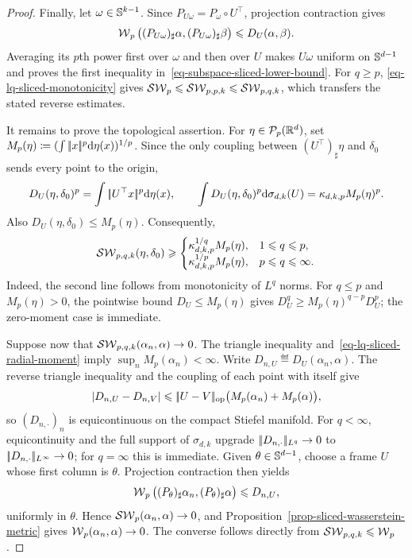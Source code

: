 \begin{proof}
	Finally, let $\omega\in\mathbb{S}^{k-1}$. Since
	$P_{U\omega}=P_\omega\circ U^\top$, projection contraction gives
	\[
		\operatorname{\mathcal{W}}_p\big((P_{U\omega})_\sharp\alpha,
		              (P_{U\omega})_\sharp\beta\big)
		\leqslant D_U(\alpha,\beta).
	\]
	Averaging its $p$th power first over $\omega$ and then over $U$ makes
	$U\omega$ uniform on $\mathbb{S}^{d-1}$ and proves the first inequality
	in~\eqref{eq-subspace-sliced-lower-bound}. For $q\geq p$,
	\eqref{eq-lq-sliced-monotonicity} gives
	$\operatorname{\mathcal{SW}}_p\leqslant\operatorname{\mathcal{SW}}_{p,p,k}\leqslant\operatorname{\mathcal{SW}}_{p,q,k}$, which transfers the stated reverse
	estimates.

	It remains to prove the topological assertion. For
	$\eta\in\mathcal{P}_p(\mathbb{R}^d)$, set
	$M_p(\eta)\coloneqq(\int|\!| x |\!|^p\mathrm{d}\eta(x))^{1/p}$. Since the only coupling
	between $(U^\top)_\sharp\eta$ and $\delta_0$ sends every point to the origin,
	\[
		D_U(\eta,\delta_0)^p
		=
		\int|\!| U^\top x |\!|^p\mathrm{d}\eta(x),
		\qquad
		\int D_U(\eta,\delta_0)^p\mathrm{d}\sigma_{d,k}(U)
		=
		\kappa_{d,k,p}M_p(\eta)^p.
	\]
	Also $D_U(\eta,\delta_0)\leq M_p(\eta)$. Consequently,
	\begin{equation}\label{eq-lq-sliced-radial-moment}
		\operatorname{\mathcal{SW}}_{p,q,k}(\eta,\delta_0)
		\geqslant
		\begin{cases}
			\kappa_{d,k,p}^{1/q}M_p(\eta), & 1\leqslant q\leqslant p,\\
			\kappa_{d,k,p}^{1/p}M_p(\eta), & p\leqslant q\leqslant\infty.
		\end{cases}
	\end{equation}
	Indeed, the second line follows from monotonicity of $L^q$ norms. For
	$q\leq p$ and $M_p(\eta)>0$, the pointwise bound
	$D_U\leq M_p(\eta)$ gives
	$D_U^q\geq M_p(\eta)^{q-p}D_U^p$; the zero-moment case is immediate.

	Suppose now that $\operatorname{\mathcal{SW}}_{p,q,k}(\alpha_n,\alpha)\to0$. The triangle inequality
	and~\eqref{eq-lq-sliced-radial-moment} imply
	$\sup_n M_p(\alpha_n)<\infty$. Write
	$D_{n,U}\eqdef D_U(\alpha_n,\alpha)$. The reverse triangle inequality and
	the coupling of each point with itself give
	\[
		\left\lvert D_{n,U}-D_{n,V}\right\rvert
		\leqslant
		|\!| U-V |\!|_{\mathrm{op}}
		\big(M_p(\alpha_n)+M_p(\alpha)\big),
	\]
	so $(D_{n,\cdot})_n$ is equicontinuous on the compact Stiefel manifold. For
	$q<\infty$, equicontinuity and the full support of $\sigma_{d,k}$ upgrade
	$|\!| D_{n,\cdot} |\!|_{L^q}\to0$ to $|\!| D_{n,\cdot} |\!|_{L^\infty}\to0$;
	for $q=\infty$ this is immediate. Given $\theta\in\mathbb{S}^{d-1}$, choose a
	frame $U$ whose first column is $\theta$. Projection contraction then yields
	\[
		\operatorname{\mathcal{W}}_p\big((P_\theta)_\sharp\alpha_n,(P_\theta)_\sharp\alpha\big)
		\leqslant D_{n,U},
	\]
	uniformly in $\theta$. Hence $\operatorname{\mathcal{SW}}_p(\alpha_n,\alpha)\to0$, and
	Proposition~\ref{prop-sliced-wasserstein-metric} gives
	$\operatorname{\mathcal{W}}_p(\alpha_n,\alpha)\to0$. The converse follows directly from
	$\operatorname{\mathcal{SW}}_{p,q,k}\leqslant\operatorname{\mathcal{W}}_p$.
\end{proof}

